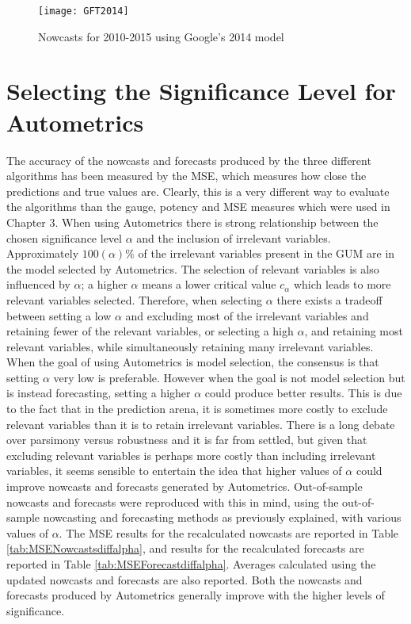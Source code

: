 \begin{figure}
\centering
\texttt{[image: GFT2014]}
\caption{Nowcasts for 2010-2015 using Google's 2014 model}
\label{fig:2014GFT}
\end{figure}


\section{Selecting the Significance Level for Autometrics}

The accuracy of the nowcasts and forecasts produced by the three different algorithms has been measured by the MSE, which measures how close the predictions and true values are. Clearly, this is a very different way to evaluate the algorithms than the gauge, potency and MSE measures which were used in Chapter 3. When using Autometrics there is strong relationship between the chosen significance level $\alpha$ and the inclusion of irrelevant variables. Approximately $100(\alpha)\%$ of the irrelevant variables present in the GUM are in the model selected by Autometrics. The selection of relevant variables is also influenced by $\alpha$; a higher $\alpha$ means a lower critical value $c_{\alpha}$ which leads to more relevant variables selected. Therefore, when selecting $\alpha$ there exists a tradeoff between setting a low $\alpha$ and excluding most of the irrelevant variables and retaining fewer of the relevant variables, or selecting a high $\alpha$, and retaining most relevant variables, while simultaneously retaining many irrelevant variables. When the goal of using Autometrics is model selection, the consensus is that setting $\alpha$ very low is preferable. However when the goal is not model selection but is instead forecasting, setting a higher $\alpha$ could produce better results. This is due to the fact that in the prediction arena, it is sometimes more costly to exclude relevant variables than it is to retain irrelevant variables. There is a long debate over parsimony versus robustness and it is far from settled, but given that excluding relevant variables is perhaps more costly than including irrelevant variables, it seems sensible to entertain the idea that higher values of $\alpha$ could improve nowcasts and forecasts generated by Autometrics.  
Out-of-sample nowcasts and forecasts were reproduced with this in mind, using the out-of-sample nowcasting and forecasting methods as previously explained, with various values of $\alpha$. The MSE results for the recalculated nowcasts are reported in Table \ref{tab:MSENowcastsdiffalpha}, and results for the recalculated forecasts are reported in Table \ref{tab:MSEForecastdiffalpha}. Averages calculated using the updated nowcasts and forecasts are also reported.  Both the nowcasts and forecasts produced by Autometrics generally improve with the higher levels of significance. 




